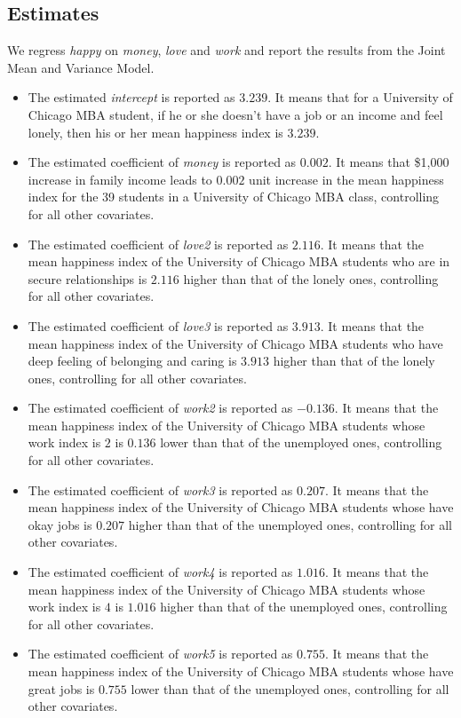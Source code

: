 \documentclass[11pt,letterpaper]{article}
\begin{document}
\subsection{Estimates}
We regress \emph{happy} on \emph{money}, \emph{love} and \emph{work} and report the results from the Joint Mean and Variance Model.
\begin{itemize}
\item The estimated \emph{intercept} is reported as $\mathbf{3.239}$. It means that for a University of Chicago MBA student, if he or she doesn't have a job or an income and feel lonely, then his or her mean happiness index is $3.239$.

\item The estimated coefficient of \emph{money} is reported as $\mathbf{0.002}$.  It means that \$1,000 increase in family income leads to $0.002$ unit increase in the mean happiness index for the 39 students in a University of Chicago MBA class, controlling for all other covariates.

\item The estimated coefficient of \emph{love2} is reported as $\mathbf{2.116}$. It means that the mean happiness index of the University of Chicago MBA students who are in secure relationships is $2.116$ higher than that of the lonely ones, controlling for all other covariates.

\item The estimated coefficient of \emph{love3} is reported as $\mathbf{3.913}$. It means that the mean happiness index of the University of Chicago MBA students who have deep feeling of belonging and caring is $3.913$ higher than that of the lonely ones, controlling for all other covariates.

\item The estimated coefficient of \emph{work2} is reported as $\mathbf{-0.136}$. It means that the mean happiness index of the University of Chicago MBA students whose work index is $2$ is $0.136$ lower than that of the unemployed ones, controlling for all other covariates.

\item The estimated coefficient of \emph{work3} is reported as $\mathbf{0.207}$. It means that the mean happiness index of the University of Chicago MBA students whose have okay jobs is $0.207$ higher than that of the unemployed ones, controlling for all other covariates.

\item The estimated coefficient of \emph{work4} is reported as $\mathbf{1.016}$. It means that the mean happiness index of the University of Chicago MBA students whose work index is $4$ is $1.016$ higher than that of the unemployed ones, controlling for all other covariates.

\item The estimated coefficient of \emph{work5} is reported as $\mathbf{0.755}$. It means that the mean happiness index of the University of Chicago MBA students whose have great jobs is $0.755$ lower than that of the unemployed ones, controlling for all other covariates.
\end{itemize}
\end{document}
